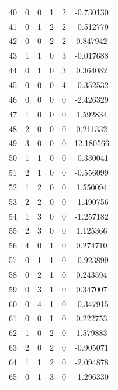 \documentclass[preprint,12pt]{elsarticle}
\begin{document}
\begin{table}
\begin{minipage}[!h]{0.25\textwidth}
{\begin{tabular}{|c|cccc|c|}
40 &   0 &   0 &   1 &   2 &  -0.730130 \\
41 &   0 &   1 &   2 &   2 &  -0.512779 \\
42 &   0 &   0 &   2 &   2 &   0.847942 \\
43 &   1 &   1 &   0 &   3 &  -0.017688 \\
44 &   0 &   1 &   0 &   3 &   0.364082 \\
45 &   0 &   0 &   0 &   4 &  -0.352532 \\
46 &   0 &   0 &   0 &   0 &  -2.426329 \\
47 &   1 &   0 &   0 &   0 &   1.592834 \\
48 &   2 &   0 &   0 &   0 &   0.211332 \\
49 &   3 &   0 &   0 &   0 &  12.180566 \\
50 &   1 &   1 &   0 &   0 &  -0.330041 \\
51 &   2 &   1 &   0 &   0 &  -0.556099 \\
52 &   1 &   2 &   0 &   0 &   1.550094 \\
53 &   2 &   2 &   0 &   0 &  -1.490756 \\
54 &   1 &   3 &   0 &   0 &  -1.257182 \\
55 &   2 &   3 &   0 &   0 &   1.125366 \\
56 &   4 &   0 &   1 &   0 &   0.274710 \\
57 &   0 &   1 &   1 &   0 &  -0.923899 \\
58 &   0 &   2 &   1 &   0 &   0.243594 \\
59 &   0 &   3 &   1 &   0 &   0.347007 \\
60 &   0 &   4 &   1 &   0 &  -0.347915 \\
61 &   0 &   0 &   1 &   0 &   0.222753 \\
62 &   1 &   0 &   2 &   0 &   1.579883 \\
63 &   2 &   0 &   2 &   0 &  -0.905071 \\
64 &   1 &   1 &   2 &   0 &  -2.094878 \\
65 &   0 &   1 &   3 &   0 &  -1.296330
\end{tabular}}
\end{minipage}%
%
\begin{minipage}[!h]{0.25\textwidth}
\end{minipage}
\end{table}
\end{document}
